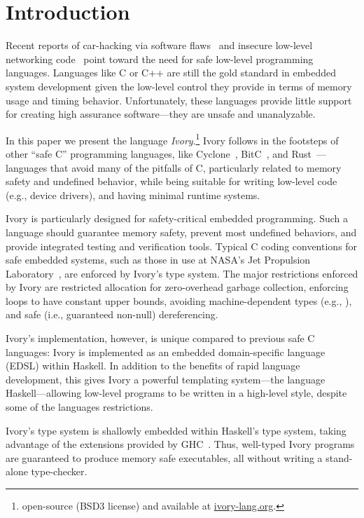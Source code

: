 \section{Introduction}
\label{sec:introduction}

Recent reports of car-hacking via software flaws~\cite{cars11} and insecure
low-level networking code~\cite{heartbleed} point toward the need for safe low-level programming
languages. Languages like C or C++ are still the gold standard in embedded
system development given the low-level control they provide in terms of memory
usage and timing behavior. Unfortunately, these languages provide
little support for creating high assurance software---they are
unsafe and unanalyzable.

In this paper we present the language \emph{Ivory}.\footnote{%
  open-source (BSD3 license) and available at \url{ivory-lang.org}.}  Ivory
follows in the footsteps of other ``safe C'' programming languages, like
Cyclone~\cite{cyclone}, BitC~\cite{bitc}, and Rust~\cite{rust}---languages that
avoid many of the pitfalls of C, particularly related to memory safety and
undefined behavior, while being suitable for writing low-level code (e.g.,
device drivers), and having minimal runtime systems.

Ivory is particularly designed for safety-critical embedded programming. Such a
language should guarantee memory safety, prevent most undefined behaviors, and
provide integrated testing and verification tools. Typical C coding conventions
for safe embedded systems, such as those in use at NASA's Jet Propulsion
Laboratory~\cite{mars}, are enforced by Ivory's type system. The major
restrictions enforced by Ivory are restricted allocation for zero-overhead
garbage collection, enforcing loops to have constant upper bounds, avoiding
machine-dependent types (e.g., ), and safe (i.e., guaranteed non-null)
dereferencing.

Ivory's implementation, however, is unique compared to previous safe C
languages: Ivory is implemented as an embedded domain-specific language (EDSL)
within Haskell.  In addition to the benefits of rapid language development, this
gives Ivory a powerful templating system---the language Haskell---allowing
low-level programs to be written in a high-level style, despite some of the
languages restrictions.

Ivory's type system is shallowly embedded within Haskell's type
system, taking advantage of the extensions provided
by GHC~\cite{dephaskell}.  Thus, well-typed Ivory programs are
guaranteed to produce memory safe executables, all without writing a
stand-alone type-checker.

